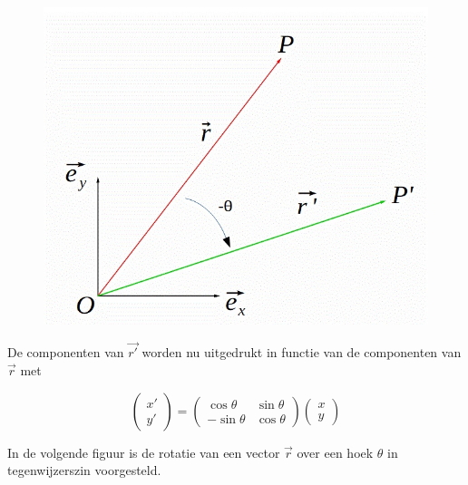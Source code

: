 \begin{figure}[h]
	\begin{center}
		\includegraphics[scale=0.5]{5_vglen_ongelijkheden_stelsels_matrices/inputs/matrices-fig-2}
	\end{center}
\end{figure}

De componenten van $\vec{r'}$ worden nu uitgedrukt in functie van de componenten van $\vec{r}$ met

\[
\left( \begin{array}{l} x' \\ y' \end{array} \right)= \left( \begin{array}{rr} \cos \theta & \sin \theta \\ -\sin \theta & \cos \theta \end{array} \right) \left( \begin{array}{l} x \\ y \end{array} \right) 
\]

In de volgende figuur is de rotatie van een vector $\vec{r}$ over een hoek $\theta$ in tegenwijzerszin voorgesteld.

